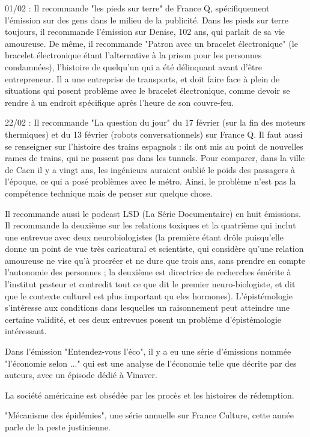 \documentclass[a4paper,12pt]{book}
\begin{document}
\par 01/02 : Il recommande "les pieds sur terre" de France Q, spécifiquement l'émission sur des gens dans le milieu de la publicité. Dans les pieds sur terre toujours, il recommande l'émission sur Denise, 102 ans, qui parlait de sa vie amoureuse. De même, il recommande "Patron avec un bracelet électronique" (le bracelet électronique étant l'alternative à la prison pour les personnes condamnées), l'histoire de quelqu'un qui a été délinquant avant d'être entrepreneur. Il a une entreprise de transports, et doit faire face à plein de situations qui posent problème avec le bracelet électronique, comme devoir se rendre à un endroit spécifique après l'heure de son couvre-feu.
\par 22/02 : Il recommande "La question du jour" du 17 février (sur la fin des moteurs thermiques) et du 13 février (robots conversationnels) sur France Q. Il faut aussi se renseigner sur l'histoire des trains espagnols : ils ont mis au point de nouvelles rames de trains, qui ne passent pas dans les tunnels. Pour comparer, dans la ville de Caen il y a vingt ans, les ingénieurs auraient oublié le poids des passagers à l'époque, ce qui a posé problèmes avec le métro. Ainsi, le problème n'est pas la compétence technique mais de penser sur quelque chose.
\par Il recommande aussi le podcast LSD (La Série Documentaire) en huit émissions. Il recommande la deuxième sur les relations toxiques et la quatrième qui inclut une entrevue avec deux neurobiologistes (la première étant drôle puisqu'elle donne un point de vue très caricatural et scientiste, qui considère qu'une relation amoureuse ne vise qu'à procréer et ne dure que trois ans, sans prendre en compte l'autonomie des personnes ; la deuxième est directrice de recherches émérite à l'institut pasteur et contredit tout ce que dit le premier neuro-biologiste, et dit que le contexte culturel est plus important qu eles hormones). L'épistémologie s'intéresse aux conditions dans lesquelles un raisonnement peut atteindre une certaine validité, et ces deux entrevues posent un problème d'épistémologie intéressant.
\par Dans l'émission "Entendez-vous l'éco", il y a eu une série d'émissions nommée "l'économie selon ..." qui est une analyse de l'économie telle que décrite par des auteurs, avec un épisode dédié à Vinaver.
\par La société américaine est obsédée par les procès et les histoires de rédemption.
\par "Mécanisme des épidémies", une série annuelle sur France Culture, cette année parle de la peste justinienne.
\end{document}

